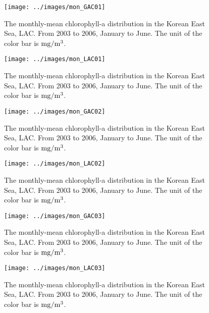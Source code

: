\begin{figure}[t]
	\centering
	\texttt{[image: ../images/mon\_GAC01]}\\
	\caption{The monthly-mean chlorophyll-a distribution in the Korean East Sea, LAC. From 2003 to 2006, January to June. The unit of the color bar is $\rm mg/m^3$.}
	\label{fig:monGAC01}
\end{figure}

\begin{figure}[t]
	\centering
	\texttt{[image: ../images/mon\_LAC01]}\\
	\caption{The monthly-mean chlorophyll-a distribution in the Korean East Sea, LAC. From 2003 to 2006, January to June. The unit of the color bar is $\rm mg/m^3$.}
	\label{fig:monLAC01}
\end{figure}

\begin{figure}[t]
	\centering
	\texttt{[image: ../images/mon\_GAC02]}\\
	\caption{The monthly-mean chlorophyll-a distribution in the Korean East Sea, LAC. From 2003 to 2006, January to June. The unit of the color bar is $\rm mg/m^3$.}
	\label{fig:monGAC02}
\end{figure}

\begin{figure}[t]
	\centering
	\texttt{[image: ../images/mon\_LAC02]}\\
	\caption{The monthly-mean chlorophyll-a distribution in the Korean East Sea, LAC. From 2003 to 2006, January to June. The unit of the color bar is $\rm mg/m^3$.}
	\label{fig:monLAC02}
\end{figure}

\begin{figure}[t]
	\centering
	\texttt{[image: ../images/mon\_GAC03]}\\
	\caption{The monthly-mean chlorophyll-a distribution in the Korean East Sea, LAC. From 2003 to 2006, January to June. The unit of the color bar is $\rm mg/m^3$.}
	\label{fig:monGAC02}
\end{figure}

\begin{figure}[t]
	\centering
	\texttt{[image: ../images/mon\_LAC03]}\\
	\caption{The monthly-mean chlorophyll-a distribution in the Korean East Sea, LAC. From 2003 to 2006, January to June. The unit of the color bar is $\rm mg/m^3$.}
	\label{fig:monLAC02}
\end{figure}



